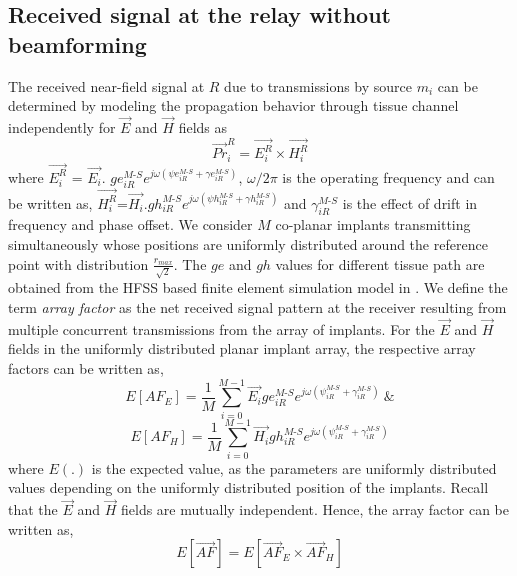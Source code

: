 \subsection{Received signal at the relay without beamforming} \label{no_beam_array}
The received near-field signal at $R$ due to transmissions by source $m_i$ can be determined  by modeling the propagation behavior through tissue channel independently for $\overrightarrow{E}$ and $\overrightarrow{H}$ fields as 
\begin{equation}
\overrightarrow{Pr}_i^R = \overrightarrow{E_i^R} \times \overrightarrow{H_i^R}
\end{equation}
where  
$\overrightarrow{E_i^R}$ = $\overrightarrow{E_i}.$ 
$ ge_{iR}^{M\text{-}S} e^{j\omega \left(\psi e_{iR}^{M\text{-}S}+\gamma e_{iR}^{M\text{-}S}\right)}$, $\omega/2\pi$ is the operating frequency and can be written as, \noindent $\displaystyle \overrightarrow{H_i^R}$=$\overrightarrow{H_i} .gh_{iR}^{M\text{-}S} e^{j\omega \left(\psi h_{iR}^{M\text{-}S}+\gamma h_{iR}^{M\text{-}S}\right)}$ and $\gamma_{iR}^{M\text{-}S}$ is the effect of drift in frequency and phase offset. 
We consider $M$ co-planar implants transmitting simultaneously whose positions are uniformly distributed around the reference point with distribution $\displaystyle \frac{r_{max}}{\sqrt{2}}$. The $ge$ and $gh$ values for different tissue path are obtained from the HFSS based finite element simulation model in \cite{tbiocas}.
We define the term \textit{array factor} as the net received signal pattern at the receiver resulting from multiple concurrent transmissions from the array of implants.
For the $\overrightarrow{E}$ and $\overrightarrow{H}$ fields in the uniformly distributed planar implant array, the respective array factors can be written as,
\begin{equation}
E[AF_E] =\frac{1}{M  } \sum_{i=0}^{M-1} \overrightarrow{E_i}ge_{iR}^{M\text{-}S} e^{j\omega \left(\psi_{iR}^{M\text{-}S}+\gamma_{iR}^{M\text{-}S}\right)} \  \&  
\end{equation} 
\begin{equation} \label{e:Harray}
E[AF_H] =\frac{1}{M  } \sum_{i=0}^{M-1} \overrightarrow{H_i}gh_{iR}^{M\text{-}S} e^{j\omega \left(\psi_{iR}^{M\text{-}S}+\gamma_{iR}^{M\text{-}S}\right)} 
\end{equation}
where $E(.)$ is the expected value, as the parameters are uniformly distributed values depending on the uniformly distributed position of the implants. Recall that the $\overrightarrow{E}$ and $\overrightarrow{H}$ fields are mutually independent. Hence, the array factor can be written as,
\begin{equation}\label{e:AF}
E[\overrightarrow{AF}] = E[\overrightarrow{AF}_E \times \overrightarrow{AF}_H]%
\end{equation} 

